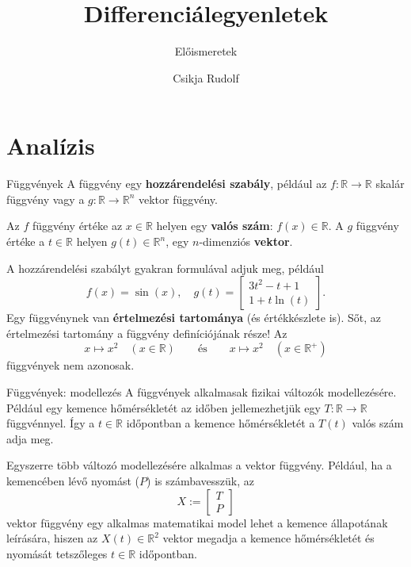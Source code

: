 \documentclass[10pt]{beamer}
\title{Differenciálegyenletek}
\subtitle{Előismeretek}
\date{}
\author{Csikja Rudolf}
\institute{Budapesti Műszaki és Gazdaságtudományi Egyetem\\Matemaikai Intézet, Analízis Tanszék}
\renewcommand{\emph}[1]{{\bf #1}}
\newcommand{\R}[0]{\mathbb{R}}
\begin{document}
\maketitle



\section{Analízis}
\begin{frame}[t]{Függvények}
A függvény egy \emph{hozzárendelési szabály}, például az
$f\colon\R\to\R$ skalár függvény vagy a $g\colon\R\to\R^n$ vektor függvény.

Az $f$ függvény értéke az $x\in\R$ helyen egy \emph{valós szám}: $f(x)\in\R.$
A $g$ függvény értéke a $t\in\R$ helyen $g(t)\in\R^n$, egy $n$-dimenziós \emph{vektor}.

A hozzárendelési szabályt gyakran formulával adjuk meg, például
\[f(x) = \sin(x), \quad g(t) = \begin{bmatrix}3t^2 - t + 1\\ 1 + t\ln(t)\end{bmatrix}.\]
Egy függvénynek van \emph{értelmezési tartománya} (és értékkészlete is).
Sőt, az értelmezési tartomány a függvény definíciójának része!
Az
\[x\mapsto x^2 \quad (x\in\R) \qquad \text{és} \qquad x \mapsto x^2\quad (x\in\R^+)\]
függvények nem azonosak.
\end{frame}

\begin{frame}[t]{Függvények: modellezés}
A függvények alkalmasak fizikai változók modellezésére.
Például egy kemence hőmérsékletét az időben jellemezhetjük
egy $T\colon \R \to \R$ függvénnyel.
Így a $t\in\R$ időpontban a kemence hőmérsékletét
a $T(t)$ valós szám adja meg.

Egyszerre több változó modellezésére alkalmas a vektor függvény.
Például, ha a kemencében lévő nyomást ($P$) is számbavesszük, az
\[X:=\begin{bmatrix}T \\ P\end{bmatrix}\]
vektor függvény egy alkalmas matematikai model lehet a kemence állapotának leírására,
hiszen az $X(t)\in\R^2$ vektor megadja a kemence hőmérsékletét és nyomását tetszőleges $t\in\R$ időpontban.
\end{frame}
\end{document}
